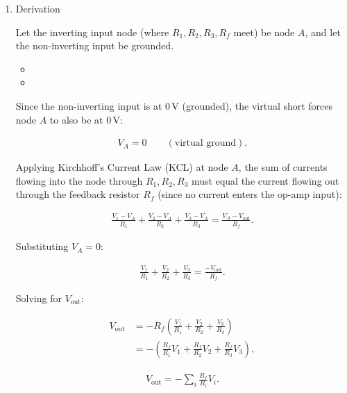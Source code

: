 \begin{enumerate}[label=\thesubsection.\arabic*,ref=\thesubsection.\theenumi]
\begin{center}
\begin{tikzpicture}
\end{tikzpicture}
\end{center}

\begin{enumerate}
\item \text Derivation

Let the inverting input node (where $R_1,R_2,R_3,R_f$ meet) be node
$A$, and let the non-inverting input be grounded.


\begin{itemize}
\item{}
\item{} 
\end{itemize}

Since the non-inverting input is at $0\,\text{V}$ (grounded), the
virtual short forces node $A$ to also be at $0\,\text{V}$:

\begin{align}
V_A=0
\qquad(\text{virtual ground}).
\end{align}

Applying Kirchhoff's Current Law (KCL) at node $A$, the sum of
currents flowing into the node through $R_1,R_2,R_3$ must equal the
current flowing out through the feedback resistor $R_f$ (since no
current enters the op-amp input):

\begin{align}
\frac{V_1-V_A}{R_1}+\frac{V_2-V_A}{R_2}+\frac{V_3-V_A}{R_3}
=\frac{V_A-V_{\text{out}}}{R_f}.
\end{align}

Substituting $V_A=0$:

\begin{align}
\frac{V_1}{R_1}+\frac{V_2}{R_2}+\frac{V_3}{R_3}
=\frac{-V_{\text{out}}}{R_f}.
\end{align}

Solving for $V_{\text{out}}$:

\begin{align}
V_{\text{out}}
&=-R_f\left(\frac{V_1}{R_1}+\frac{V_2}{R_2}+\frac{V_3}{R_3}\right)\\
&=-\left(\frac{R_f}{R_1}V_1+\frac{R_f}{R_2}V_2+\frac{R_f}{R_3}V_3\right),
\end{align}


\begin{align}
V_{\text{out}}=-\sum_{i}\frac{R_f}{R_i}V_i.
\end{align}
\end{enumerate}


\end{enumerate}

